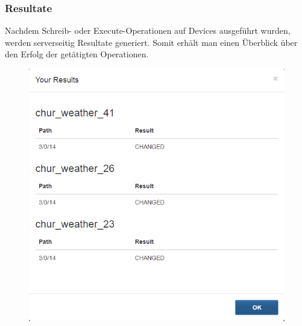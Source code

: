 \subsubsection{Resultate}
Nachdem Schreib- oder Execute-Operationen auf Devices ausgeführt wurden, werden serverseitig Resultate generiert. Somit erhält man einen Überblick über den Erfolg der getätigten Operationen.

\begin{figure}[H]
\includegraphics[scale=0.57]{../05_Schlussbericht/images/benutzeranleitung/configresults.png}
\end{figure}
